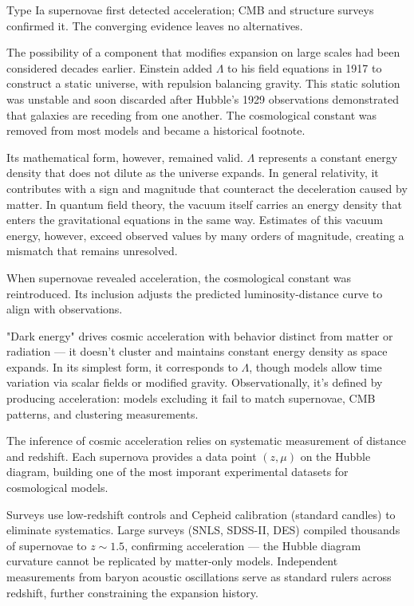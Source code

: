 Type Ia supernovae first detected acceleration; CMB and structure surveys confirmed it. The converging evidence leaves no alternatives.

The possibility of a component that modifies expansion on large scales had been considered decades earlier. Einstein added $\Lambda$ to his field equations in 1917 to construct a static universe, with repulsion balancing gravity. This static solution was unstable and soon discarded after Hubble's 1929 observations demonstrated that galaxies are receding from one another. The cosmological constant was removed from most models and became a historical footnote.

Its mathematical form, however, remained valid. $\Lambda$ represents a constant energy density that does not dilute as the universe expands. In general relativity, it contributes with a sign and magnitude that counteract the deceleration caused by matter. In quantum field theory, the vacuum itself carries an energy density that enters the gravitational equations in the same way. Estimates of this vacuum energy, however, exceed observed values by many orders of magnitude, creating a mismatch that remains unresolved.

When supernovae revealed acceleration, the cosmological constant was reintroduced. Its inclusion adjusts the predicted luminosity-distance curve to align with observations.

"Dark energy" drives cosmic acceleration with behavior distinct from matter or radiation — it doesn't cluster and maintains constant energy density as space expands. In its simplest form, it corresponds to $\Lambda$, though models allow time variation via scalar fields or modified gravity. Observationally, it's defined by producing acceleration: models excluding it fail to match supernovae, CMB patterns, and clustering measurements.

The inference of cosmic acceleration relies on systematic measurement of distance and redshift. Each supernova provides a data point $(z, \mu)$ on the Hubble diagram, building one of the most imporant experimental datasets for cosmological models.

Surveys use low-redshift controls and Cepheid calibration (standard candles) to eliminate systematics. Large surveys (SNLS, SDSS-II, DES) compiled thousands of supernovae to $z \sim 1.5$, confirming acceleration — the Hubble diagram curvature cannot be replicated by matter-only models. Independent measurements from baryon acoustic oscillations serve as standard rulers across redshift, further constraining the expansion history.

